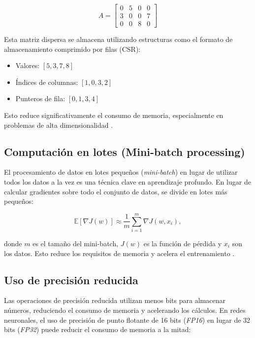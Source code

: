 \begin{itemize}
		\begin{equation}
			A = 
			\begin{bmatrix}
				0 & 5 & 0 & 0 \\
				3 & 0 & 0 & 7 \\
				0 & 0 & 8 & 0
			\end{bmatrix}
		\end{equation}
		
		Esta matriz dispersa se almacena utilizando estructuras como el formato de almacenamiento comprimido por filas (CSR):
		
		\begin{itemize}
			\item Valores: \([5, 3, 7, 8]\)
			\item Índices de columnas: \([1, 0, 3, 2]\)
			\item Punteros de fila: \([0, 1, 3, 4]\)
		\end{itemize}
		
		Esto reduce significativamente el consumo de memoria, especialmente en problemas de alta dimensionalidad \cite{saad2003iterative}.
		
		\subsection{Computación en lotes (Mini-batch processing)}
		
		El procesamiento de datos en lotes pequeños (\textit{mini-batch}) en lugar de utilizar todos los datos a la vez es una técnica clave en aprendizaje profundo. En lugar de calcular gradientes sobre todo el conjunto de datos, se divide en lotes más pequeños:
		
		\begin{equation}
			\mathbb{E}[\nabla J(w)] \approx \frac{1}{m} \sum_{i=1}^{m} \nabla J(w, x_i),
		\end{equation}
		
		donde \(m\) es el tamaño del mini-batch, \(J(w)\) es la función de pérdida y \(x_i\) son los datos. Esto reduce los requisitos de memoria y acelera el entrenamiento \cite{goodfellow2016deep}.
		
		\subsection{Uso de precisión reducida}
		
		Las operaciones de precisión reducida utilizan menos bits para almacenar números, reduciendo el consumo de memoria y acelerando los cálculos. En redes neuronales, el uso de precisión de punto flotante de 16 bits (\textit{FP16}) en lugar de 32 bits (\textit{FP32}) puede reducir el consumo de memoria a la mitad:
		

\end{itemize}
